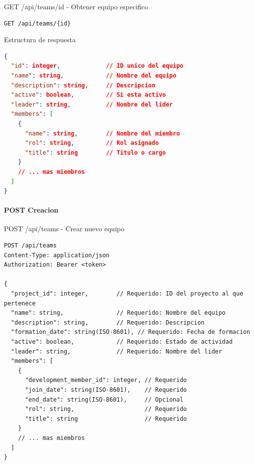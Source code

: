 \documentclass[11pt,a4paper]{article}
\begin{document}
\begin{center}
	\begin{minipage}{\textwidth}
		\begin{codebox}{GET /api/teams/{id} - Obtener equipo especifico}
			\begin{lstlisting}[language=HTTP]
GET /api/teams/{id}
\end{lstlisting}
		\end{codebox}
	\end{minipage}
\end{center}

\begin{center}
	\begin{minipage}{\textwidth}
		\begin{codebox}{Estructura de respuesta}
			\begin{lstlisting}[language=json]
{
  "id": integer,             // ID unico del equipo
  "name": string,            // Nombre del equipo
  "description": string,     // Descripcion
  "active": boolean,         // Si esta activo
  "leader": string,          // Nombre del lider
  "members": [
    {
      "name": string,        // Nombre del miembro
      "rol": string,         // Rol asignado
      "title": string        // Titulo o cargo
    }
    // ... mas miembros
  ]
}
\end{lstlisting}
		\end{codebox}
	\end{minipage}
\end{center}

\paragraph{POST Creacion}

\begin{center}
	\begin{minipage}{\textwidth}
		\begin{codebox}{POST /api/teams - Crear nuevo equipo}
			\begin{lstlisting}[language=HTTP]
POST /api/teams
Content-Type: application/json
Authorization: Bearer <token>

{
  "project_id": integer,        // Requerido: ID del proyecto al que pertenece
  "name": string,               // Requerido: Nombre del equipo
  "description": string,        // Requerido: Descripcion
  "formation_date": string(ISO-8601), // Requerido: Fecha de formacion
  "active": boolean,            // Requerido: Estado de actividad
  "leader": string,             // Requerido: Nombre del lider
  "members": [
    {
      "development_member_id": integer, // Requerido
      "join_date": string(ISO-8601),    // Requerido
      "end_date": string(ISO-8601),     // Opcional
      "rol": string,                    // Requerido
      "title": string                   // Requerido
    }
    // ... mas miembros
  ]
}
\end{lstlisting}
		\end{codebox}
	\end{minipage}
\end{center}
\end{document}
